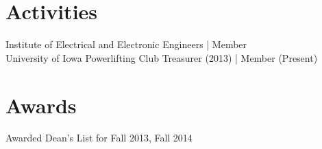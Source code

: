 \documentclass[letter]{res}
\begin{document}
\begin{resume}
\section{Activities} 
 Institute of Electrical and Electronic Engineers | Member \\
 University of Iowa Powerlifting Club Treasurer (2013) | Member (Present) 
 
\section{Awards} 
 Awarded Dean’s List for Fall 2013, Fall 2014

\end{resume}
\end{document}
